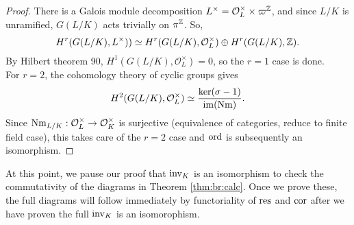 \documentclass[class=article, crop=false]{standalone}
\begin{document}
\begin{proof}
	There is a Galois module decomposition $L^{\times}=\mathcal{O}_L^{\times}\times\varpi^{\mathbb{Z}}$, and since $L/K$ is unramified, $G(L/K)$ acts trivially on $\pi^{\mathbb{Z}}$. So,
	\[
		H^{r}(G(L/K),L^{\times}))\simeq H^{r}(G(L/K),\mathcal{O}_L^{\times})\oplus H^{r}(G(L/K),\mathbb{Z})
	.\] 
	By Hilbert theorem 90, $H^{1}(G(L/K),\mathcal{O}_L^{\times})=0$, so the $r=1$ case is done.\\
	For $r=2$, the cohomology theory of cyclic groups gives
	\[
		H^{2}(G(L/K),\mathcal{O}_L^{\times})\simeq\frac{\ker(\sigma-1)}{\mathrm{im}(\mathrm{Nm})}
	.\] 
	Since $\mathrm{Nm}_{L/K}:\mathcal{O}_L^{\times}\to\mathcal{O}_K^{\times}$ 
	is surjective 
	{\color{red} (equivalence of categories, reduce to finite field case)},
	this takes care of the 
	$r=2$ case and $\operatorname{ord}$ is subsequently an isomorphism.
\end{proof}

At this point, we pause our proof that \(\operatorname{inv}_{K}\) is an isomorphism
to check the commutativity of the diagrams in Theorem \ref{thm:br:calc}.
{\color{red} Once we prove these, the full diagrams will 
follow immediately by functoriality of \(\operatorname{res}\) and \(\operatorname{cor}\)
after we have proven the full \(\operatorname{inv}_{K}\) is an isomorophism.}
\end{document}
